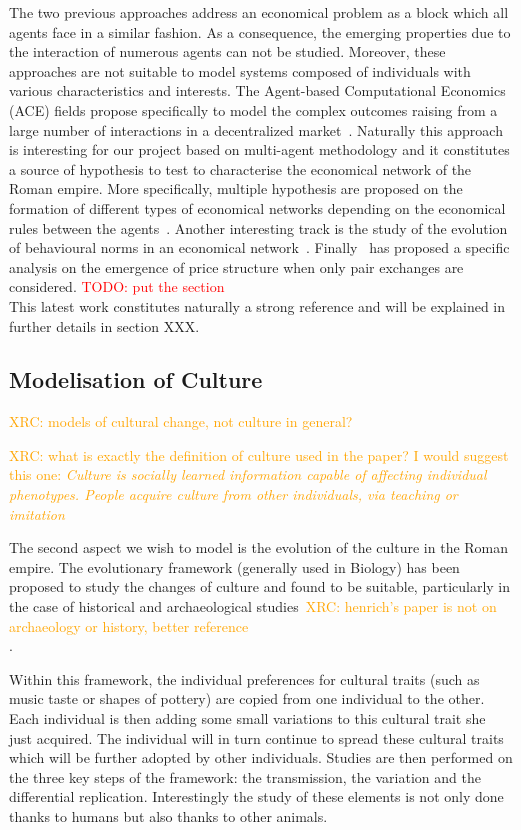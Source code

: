 \documentclass{wscpaperproc}
\newcommand{\memo}[2]{\textcolor{#1}{#2}}
\newcommand{\todo}[1]{\memo{red}{TODO: #1\\}}
\newcommand{\xrc}[1]{\memo{orange}{XRC: #1\\}}
\begin{document}
The two previous approaches address an economical problem as a block which all agents face in a similar fashion. As a consequence, the emerging properties due to the interaction of numerous agents can not be studied. Moreover, these approaches are not suitable to model systems composed of individuals with various characteristics and interests. The Agent-based Computational Economics (ACE) fields propose specifically to model the complex outcomes raising from a large number of interactions in a decentralized market~\cite{tesfatsion_agent-based_2003}. Naturally this approach is interesting for our project based on multi-agent methodology and it constitutes a source of hypothesis to test to characterise the economical network of the Roman empire. More specifically, multiple hypothesis are proposed on the formation of different types of economical networks depending on the economical rules between the agents~\cite{kirman_evolving_2001,tesfatsion_structure_2001}. Another interesting track is the study of the evolution of behavioural norms in an economical network~\cite{epstein_learning_2001,axelrod_complexity_1997}. Finally~\cite{gintis_emergence_2006} has proposed a specific analysis on the emergence of price structure when only pair exchanges are considered. 
\todo{put the section}
This latest work constitutes naturally a strong reference and will be explained in further details in section XXX.


\subsection{Modelisation of Culture}

\xrc{models of cultural change, not culture in general?}

\xrc{what is exactly the definition of culture used in the paper? I would suggest this one: \emph{Culture is socially learned information capable of affecting  individual phenotypes. People acquire culture from other  individuals, via teaching or imitation} \cite{richerson1996}}

The second aspect we wish to model is the evolution of the culture in the Roman empire. The evolutionary framework (generally used in Biology) has been proposed to study the changes of culture and found to be suitable,  particularly in the case of historical and archaeological studies~\cite{lycett_cultural_2015,henrich_evolution_2003}\xrc{henrich's paper is not on archaeology or history, better reference \cite{shennan_2008}}.

Within this framework, the individual preferences for cultural traits (such as music taste or shapes of pottery) are copied from one individual to the other. Each individual is then adding some small variations to this cultural trait she just acquired. The individual will in turn continue to spread these cultural traits which will be further adopted by other individuals. Studies are then performed on the three key steps of the framework: the transmission, the variation and the differential replication. Interestingly the study of these elements is not only done thanks to humans but also thanks to other animals.
\end{document}
